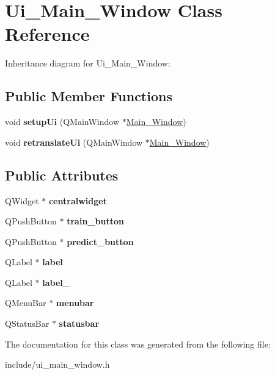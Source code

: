 \hypertarget{classUi__Main__Window}{}\section{Ui\+\_\+\+Main\+\_\+\+Window Class Reference}
\label{classUi__Main__Window}


Inheritance diagram for Ui\+\_\+\+Main\+\_\+\+Window\+:
\subsection*{Public Member Functions}
\begin{DoxyCompactItemize}
\item 
\mbox{\label{classUi__Main__Window_a88f03e3f67bcffb12641407cd9b395e2}} 
void {\bfseries setup\+Ui} (Q\+Main\+Window $\ast$\hyperlink{classMain__Window}{Main\+\_\+\+Window})
\item 
\mbox{\label{classUi__Main__Window_a0eac62ef94dc88556004bfc0cf2cab15}} 
void {\bfseries retranslate\+Ui} (Q\+Main\+Window $\ast$\hyperlink{classMain__Window}{Main\+\_\+\+Window})
\end{DoxyCompactItemize}
\subsection*{Public Attributes}
\begin{DoxyCompactItemize}
\item 
\mbox{\label{classUi__Main__Window_af0e764b378b7235798e1cd2fe932787d}} 
Q\+Widget $\ast$ {\bfseries centralwidget}
\item 
\mbox{\label{classUi__Main__Window_a8dbba45531ac8fe36d04f940ee5fe044}} 
Q\+Push\+Button $\ast$ {\bfseries train\+\_\+button}
\item 
\mbox{\label{classUi__Main__Window_a602782daba8896fb6269d4c4873cbf90}} 
Q\+Push\+Button $\ast$ {\bfseries predict\+\_\+button}
\item 
\mbox{\label{classUi__Main__Window_afe543d55066d0c25634feb61e4d095bc}} 
Q\+Label $\ast$ {\bfseries label}
\item 
\mbox{\label{classUi__Main__Window_aaf37d6dfb011d3add4881e8ed68b6133}} 
Q\+Label $\ast$ {\bfseries label\+\_}
\item 
\mbox{\label{classUi__Main__Window_ab34e1f3fe23fccef905a5de9bf55d5e4}} 
Q\+Menu\+Bar $\ast$ {\bfseries menubar}
\item 
\mbox{\label{classUi__Main__Window_a87d92af0212873732901b0adb0659740}} 
Q\+Status\+Bar $\ast$ {\bfseries statusbar}
\end{DoxyCompactItemize}


The documentation for this class was generated from the following file\+:\begin{DoxyCompactItemize}
\item 
include/ui\+\_\+main\+\_\+window.\+h\end{DoxyCompactItemize}
